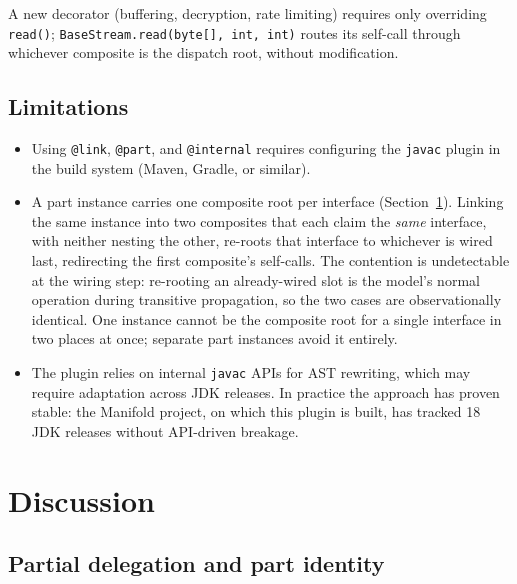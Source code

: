 \documentclass[sigplan,10pt,review,anonymous]{acmart}
\theoremstyle{acmplain}
\newcommand{\code}[1]{\texttt{#1}}
\begin{document}
A new decorator (buffering, decryption, rate limiting) requires only
overriding \code{read()}; \code{BaseStream.read(byte[], int, int)} routes its
self-call through whichever composite is the dispatch root, without
modification.

\subsection{Limitations}\label{sec:limitations}

\begin{itemize}
  \item Using \code{@link}, \code{@part}, and \code{@internal} requires
        configuring the \texttt{javac} plugin in the build system (Maven,
        Gradle, or similar).
  \item A part instance carries one composite root per interface
        (Section~\ref{sec:discussion}). Linking the same instance into two
        composites that each claim the \emph{same} interface, with neither
        nesting the other, re-roots that interface to whichever is wired last,
        redirecting the first composite's self-calls. The contention
        is undetectable at the wiring step: re-rooting an already-wired slot
        is the model's normal operation during transitive propagation, so the
        two cases are observationally identical. One instance cannot be the
        composite root for a single interface in two places at once; separate
        part instances avoid it entirely.
  \item The plugin relies on internal \texttt{javac} APIs for AST
        rewriting, which may require adaptation across JDK releases.
        In practice the approach has proven stable: the Manifold project,
        on which this plugin is built, has tracked 18 JDK releases
        without API-driven breakage.
\end{itemize}

\section{Discussion}
\label{sec:discussion}

\subsection{Partial delegation and part identity}
\label{subsec:identity}
\end{document}
